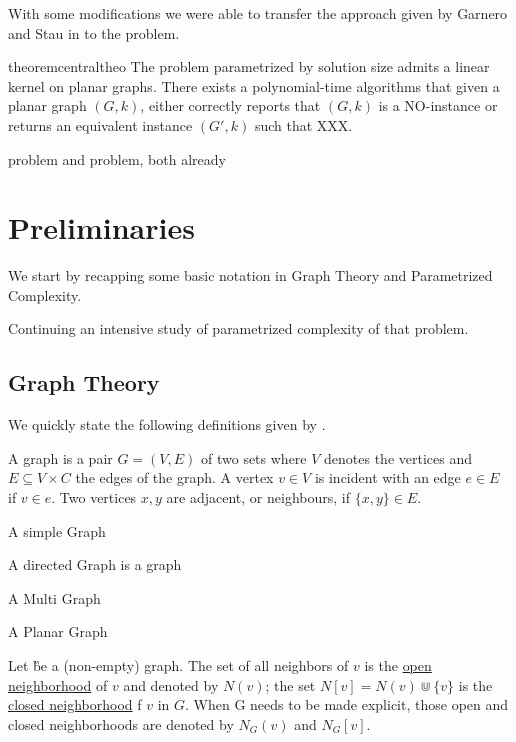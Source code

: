 With some  modifications we were able to transfer the approach given by Garnero and Stau in \cite{Garnero2018} to the \sdom problem.

\begin{restatable}[]{theorem}{centraltheo}\label{thm:central}
    The \sdom problem parametrized by solution size admits a linear kernel on planar graphs. There exists a polynomial-time algorithms that given a planar graph $(G, k)$, either correctly reports that $(G, k)$ is a NO-instance or returns an equivalent instance $(G', k)$ such that XXX.
\end{restatable}

 \dom problem and \tdom problem, both already 

\chapter{Preliminaries}
We start by recapping some basic notation in Graph Theory and Parametrized Complexity. 

Continuing an intensive study of parametrized complexity of that problem. 

\section{Graph Theory}
We quickly state the following definitions given by {\cite[p.~xxx]{diestel10}}.

\begin{definition}
A graph is a pair $G = (V, E)$ of two sets where $V$ denotes the vertices and $E \subseteq V \times C$ the edges of the graph.  A vertex $v \in V$ is incident with an edge $e \in E$ if $v \in e$. Two vertices $x, y$ are adjacent, or neighbours, if $\{x,y \} \in E$.
\end{definition}

\begin{definition}
    A simple Graph

    A directed Graph is a graph

    A Multi Graph

    A Planar Graph
\end{definition}

\begin{definition}
    Let \G be a (non-empty) graph. 
    The set of all neighbors of $v$ is the \underline{open neighborhood} of $v$ and denoted by $N(v)$; the set $N[v] = N(v) \Cup \{v\}$ is the \underline{closed neighborhood} f $v$ in $G$. When G needs to be made explicit, those open and closed neighborhoods are denoted by $N_G(v)$ and $N_G[v]$. 
\end{definition}

